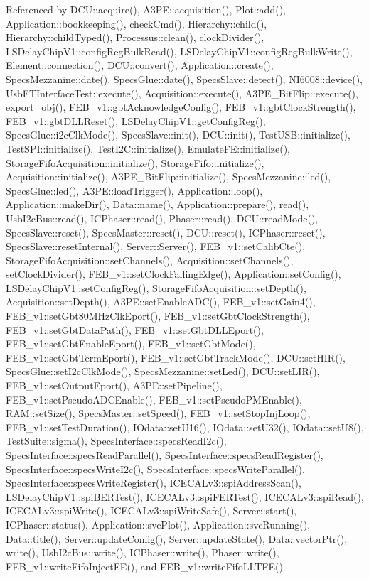 Referenced by DCU::acquire(), A3PE::acquisition(), Plot::add(), Application::bookkeeping(), checkCmd(), Hierarchy::child(), Hierarchy::childTyped(), Processus::clean(), clockDivider(), LSDelayChipV1::configRegBulkRead(), LSDelayChipV1::configRegBulkWrite(), Element::connection(), DCU::convert(), Application::create(), SpecsMezzanine::date(), SpecsGlue::date(), SpecsSlave::detect(), NI6008::device(), UsbFTInterfaceTest::execute(), Acquisition::execute(), A3PE\_\-BitFlip::execute(), export\_\-obj(), FEB\_\-v1::gbtAcknowledgeConfig(), FEB\_\-v1::gbtClockStrength(), FEB\_\-v1::gbtDLLReset(), LSDelayChipV1::getConfigReg(), SpecsGlue::i2cClkMode(), SpecsSlave::init(), DCU::init(), TestUSB::initialize(), TestSPI::initialize(), TestI2C::initialize(), EmulateFE::initialize(), StorageFifoAcquisition::initialize(), StorageFifo::initialize(), Acquisition::initialize(), A3PE\_\-BitFlip::initialize(), SpecsMezzanine::led(), SpecsGlue::led(), A3PE::loadTrigger(), Application::loop(), Application::makeDir(), Data::name(), Application::prepare(), read(), UsbI2cBus::read(), ICPhaser::read(), Phaser::read(), DCU::readMode(), SpecsSlave::reset(), SpecsMaster::reset(), DCU::reset(), ICPhaser::reset(), SpecsSlave::resetInternal(), Server::Server(), FEB\_\-v1::setCalibCte(), StorageFifoAcquisition::setChannels(), Acquisition::setChannels(), setClockDivider(), FEB\_\-v1::setClockFallingEdge(), Application::setConfig(), LSDelayChipV1::setConfigReg(), StorageFifoAcquisition::setDepth(), Acquisition::setDepth(), A3PE::setEnableADC(), FEB\_\-v1::setGain4(), FEB\_\-v1::setGbt80MHzClkEport(), FEB\_\-v1::setGbtClockStrength(), FEB\_\-v1::setGbtDataPath(), FEB\_\-v1::setGbtDLLEport(), FEB\_\-v1::setGbtEnableEport(), FEB\_\-v1::setGbtMode(), FEB\_\-v1::setGbtTermEport(), FEB\_\-v1::setGbtTrackMode(), DCU::setHIR(), SpecsGlue::setI2cClkMode(), SpecsMezzanine::setLed(), DCU::setLIR(), FEB\_\-v1::setOutputEport(), A3PE::setPipeline(), FEB\_\-v1::setPseudoADCEnable(), FEB\_\-v1::setPseudoPMEnable(), RAM::setSize(), SpecsMaster::setSpeed(), FEB\_\-v1::setStopInjLoop(), FEB\_\-v1::setTestDuration(), IOdata::setU16(), IOdata::setU32(), IOdata::setU8(), TestSuite::sigma(), SpecsInterface::specsReadI2c(), SpecsInterface::specsReadParallel(), SpecsInterface::specsReadRegister(), SpecsInterface::specsWriteI2c(), SpecsInterface::specsWriteParallel(), SpecsInterface::specsWriteRegister(), ICECALv3::spiAddressScan(), LSDelayChipV1::spiBERTest(), ICECALv3::spiFERTest(), ICECALv3::spiRead(), ICECALv3::spiWrite(), ICECALv3::spiWriteSafe(), Server::start(), ICPhaser::status(), Application::svcPlot(), Application::svcRunning(), Data::title(), Server::updateConfig(), Server::updateState(), Data::vectorPtr(), write(), UsbI2cBus::write(), ICPhaser::write(), Phaser::write(), FEB\_\-v1::writeFifoInjectFE(), and FEB\_\-v1::writeFifoLLTFE().


